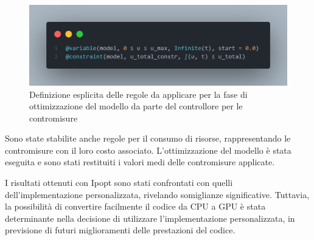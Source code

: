 \begin{figure}[H]
	\begin{center}
		\includegraphics[width=\textwidth]{img/controller_rules_1.png}
		\caption{Definizione esplicita delle regole da applicare per la fase di ottimizzazione del modello da parte del controllore per le contromisure}
		\label{fig:controller_rules_1}	
    \end{center}
\end{figure}

Sono state stabilite anche regole per il consumo di risorse, 
rappresentando le contromisure con il loro costo associato. 
L'ottimizzazione del modello è stata eseguita e sono stati restituiti 
i valori medi delle contromisure applicate.

I risultati ottenuti con Ipopt sono stati confrontati con quelli 
dell'implementazione personalizzata, rivelando somiglianze 
significative. Tuttavia, la possibilità di convertire facilmente 
il codice da CPU a GPU è stata determinante nella decisione di 
utilizzare l'implementazione personalizzata, in previsione di futuri 
miglioramenti delle prestazioni del codice.

